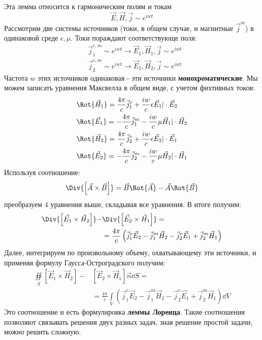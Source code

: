 Эта лемма относится к гармоническим полям и токам
\begin{equation}
	\vec{E},\vec{H},\vec{j}\sim e^{iwt}
\end{equation}
Рассмотрим две системы источников (токи, в общем случае, и магнитные $\vec{j}^m$) в одинаковой среде $\epsilon,\mu$.
Токи пораждают соответствующе поля:
\begin{align*}
	&\vec{j}^{e,m}_1 \sim e^{iwt} \rightarrow \vec{E}_1,\vec{H}_1,\vec{j}\sim e^{iwt}\\
	&\vec{j}^{e,m}_2 \sim e^{iwt} \rightarrow \vec{E}_2,\vec{H}_2,\vec{j}\sim e^{iwt}
\end{align*}
Частота $w$ этих источников одинаковая - эти источники \textbf{монохроматические}. Мы можем записать уравнения Максвелла
в общем виде, с учетом фихтивных токов:
\begin{align*}
	&\Rot{\vec{H}_1} = \frac{4\pi}{c}\vec{j}^{e}_1 + \frac{iw}{c}\epsilon\vec{E}_1|\cdot\vec{E}_2\\
	&\Rot{\vec{E}_1} = -\frac{4\pi}{c}\vec{j}^{m}_1 - \frac{iw}{c}\mu\vec{H}_1|\cdot\vec{H}_2\\
	&\Rot{\vec{H}_2} = \frac{4\pi}{c}\vec{j}^{e}_2 + \frac{iw}{c}\epsilon\vec{E}_2|\cdot\vec{E}_1\\
	&\Rot{\vec{E}_2} = -\frac{4\pi}{c}\vec{j}^{m}_2 - \frac{iw}{c}\mu\vec{H}_2|\cdot\vec{H}_1
\end{align*}
Используя соотношение:
\begin{equation}
	\Div{\left[\vec{A} \times \vec{B} \right]} = \vec{B}\Rot{\vec{A}} - \vec{A}\Rot{\vec{B}}
\end{equation}
преобразуем 4 уравнения выше, складывая все уравнения. В итоге получим:
\begin{align*}
	\Div{\left[\vec{E}_1 \times \vec{H}_2\right]} - &\Div{\left[\vec{E}_2 \times \vec{H}_1\right]} = \\
	& = \frac{4\pi}{c}\left( \vec{j}^{e}_1 \vec{E}_2-\vec{j}^{m}_1 \vec{H}_2-\vec{j}^{e}_2 \vec{E}_1+\vec{j}^{m}_2 \vec{H}_1 \right)
\end{align*}
Далее, интегрируем по произвольному объему, охватывающему эти источники, и применяя формулу Гаусса-Остроградского
получим:
\begin{align*}
	\oiint \limits_S \left[\vec{E}_1 \times \vec{H}_2 \right] - &\left[ \vec{E}_2 \times \vec{H}_1\right] \vec{n} \dd S =\\
	&=\frac{4 \pi}{c} \int \limits_V \left( \vec{j}^{e}_1 \vec{E}_2-\vec{j}^{m}_1 \vec{H}_2-\vec{j}^{e}_2 \vec{E}_1+\vec{j}^{m}_2 \vec{H}_1 \right) \dd V
\end{align*}
Это соотношение и есть формулировка \textbf{леммы Лоренца}. Такие соотношения позволяют связывать решения двух разных
задач, зная решение простой задачи, можно решить сложную.

